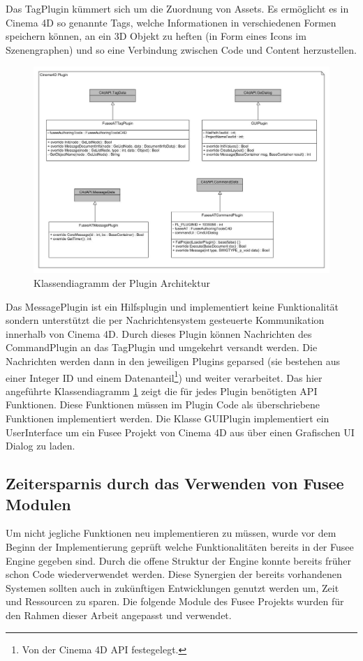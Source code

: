 \documentclass[pagesize, paper=a4, fontsize=12pt, titlepage=true, headings=small, headnosepline, abstractoff, liststotoc, nochapterprefix, plainheadsepline, twoside]{scrreprt}
\begin{document}
Das TagPlugin kümmert sich um die Zuordnung von Assets. Es ermöglicht es in Cinema 4D so genannte Tags, welche Informationen in verschiedenen Formen speichern können, an ein 3D Objekt zu heften (in Form eines Icons im Szenengraphen) und so eine Verbindung zwischen Code und Content herzustellen.
\begin{figure}[ht]
	\centering
	\includegraphics[width=\linewidth]{Bilder/Klassendiagramm_Plugin.jpg}
	\caption{Klassendiagramm der Plugin Architektur}
	\label{KlassendiagrammPluginArchitektur}
\end{figure}
Das MessagePlugin ist ein Hilfsplugin und implementiert keine Funktionalität sondern unterstützt die per Nachrichtensystem gesteuerte Kommunikation innerhalb von Cinema 4D. Durch dieses Plugin können Nachrichten des CommandPlugin an das TagPlugin und umgekehrt versandt werden. Die Nachrichten werden dann in den jeweiligen Plugins geparsed (sie bestehen aus einer Integer ID und einem Datenanteil\footnote{Von der Cinema 4D API festegelegt.}) und weiter verarbeitet. 
Das hier angeführte Klassendiagramm \ref{KlassendiagrammPluginArchitektur} zeigt die für jedes Plugin benötigten API Funktionen. Diese Funktionen müssen im Plugin Code als überschriebene Funktionen implementiert werden. Die Klasse GUIPlugin implementiert ein UserInterface um ein Fusee Projekt von Cinema 4D aus über einen Grafischen UI Dialog zu laden.

\subsection{Zeitersparnis durch das Verwenden von Fusee Modulen}
Um nicht jegliche Funktionen neu implementieren zu müssen, wurde vor dem Beginn der Implementierung geprüft welche Funktionalitäten bereits in der Fusee Engine gegeben sind. Durch die offene Struktur der Engine konnte bereits früher schon Code wiederverwendet werden. Diese Synergien der bereits vorhandenen Systemen sollten auch in zukünftigen Entwicklungen genutzt werden um, Zeit und Ressourcen zu sparen.
Die folgende Module des Fusee Projekts wurden für den Rahmen dieser Arbeit angepasst und verwendet.
\end{document}
